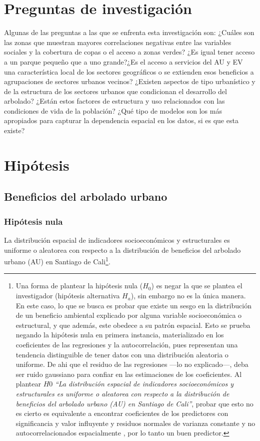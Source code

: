 \documentclass[12pt,]{book}
\let\rmarkdownfootnote\footnote%
\def\footnote{\protect\rmarkdownfootnote}
\begin{document}
\section{Preguntas de investigación}\label{preguntas-de-investigacion}

Algunas de las preguntas a las que se enfrenta esta investigación son:
¿Cuáles son las zonas que muestran mayores correlaciones negativas entre
las variables sociales y la cobertura de copas o el acceso a zonas
verdes? ¿Es igual tener acceso a un parque pequeño que a uno grande?¿Es
el acceso a servicios del AU y EV una característica local de los
sectores geográficos o se extienden esos beneficios a agrupaciones de
sectores urbanos vecinos? ¿Existen aspectos de tipo urbanístico y de la
estructura de los sectores urbanos que condicionan el desarrollo del
arbolado? ¿Están estos factores de estructura y uso relacionados con las
condiciones de vida de la población? ¿Qué tipo de modelos son los más
apropiados para capturar la dependencia espacial en los datos, si es que
esta existe?

\section{Hipótesis}\label{hipotesis}

\subsection{Beneficios del arbolado
urbano}\label{beneficios-del-arbolado-urbano}

\subsubsection{Hipótesis nula}\label{hipotesis-nula}

La distribución espacial de indicadores socioeconómicos y estructurales
es uniforme o aleatorea con respecto a la distribución de beneficios del
arbolado urbano (AU) en Santiago de Cali\footnote{Una forma de plantear
  la hipótesis nula (\(H_0\)) es negar la que se plantea el investigador
  (hipótesis alternativa \(H_a\)), sin embargo no es la única manera. En
  este caso, lo que se busca es probar que existe un sesgo en la
  distribución de un beneficio ambiental explicado por alguna variable
  socioeconómica o estructural, y que además, este obedece a su patrón
  espacial. Esto se prueba negando la hipótesis nula en primera
  instancia, materializado en los coeficientes de las regresiones y la
  autocorrelación, pues representan una tendencia distinguible de tener
  datos con una distribución aleatoria o uniforme. De ahi que el residuo
  de las regresiones ---lo no explicado---, deba ser ruido gaussiano
  para confiar en las estimaciones de los coeficientes. Al plantear
  \(H0\) \emph{``La distribución espacial de indicadores socioeconómicos
  y estructurales es uniforme o aleatorea con respecto a la distribución
  de beneficios del arbolado urbano (AU) en Santiago de Cali''}, probar
  que esto no es cierto es equivalente a encontrar coeficientes de los
  predictores con significancia y valor influyente y residuos normales
  de varianza constante y no autocorrelacionados espacialmente , por lo
  tanto un buen predictor.}.
\end{document}
